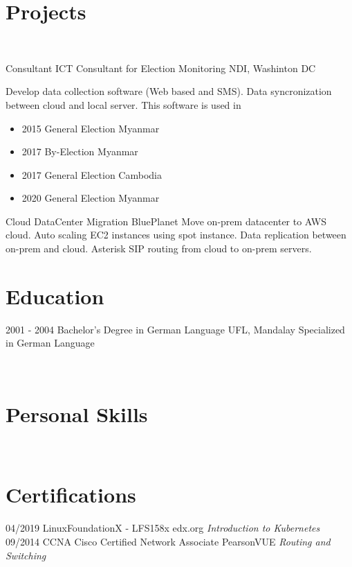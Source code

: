 \documentclass[]{friggeri-cv}
\begin{document}
\section{Projects}
~
\begin{entrylist}
	\entry
	{Consultant}
	{ICT Consultant for Election Monitoring}
	{NDI, Washinton DC}
	{Develop data collection software (Web based and SMS). Data syncronization between cloud and local server. This software is used in 
		\begin{itemize}
			\item 2015 General Election Myanmar
			\item 2017 By-Election Myanmar
			\item 2017 General Election Cambodia
			\item 2020 General Election Myanmar
		\end{itemize}}
	\entry
	{Cloud}
	{DataCenter Migration}
	{BluePlanet}
	{Move on-prem datacenter to AWS cloud. Auto scaling EC2 instances using spot instance. Data replication between on-prem and cloud. Asterisk SIP routing from cloud to on-prem servers.\\}
\end{entrylist}
\section{Education}
\begin{entrylist}
  \entry
    {2001 - 2004}
    {Bachelor's Degree in German Language}
    {UFL, Mandalay}
    {Specialized in German Language\\ }
\end{entrylist}


\begin{aside}
~
~
~
  \section{Personal Skills}
	~
\end{aside}
\section{Certifications}
\begin{entrylist}
	\entry
	{04/2019}
	{LinuxFoundationX - LFS158x}
	{edx.org}
	{\emph{Introduction to Kubernetes}}
	\entry
	{09/2014}
	{CCNA Cisco Certified Network Associate}
	{PearsonVUE}
	{\emph{Routing and Switching}}
\end{entrylist}
\end{document}
